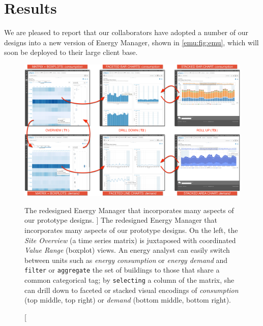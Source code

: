 \section{Results}
\label{emu:results}


We are pleased to report that our collaborators have adopted a number of our designs into a new version of Energy Manager, shown in \autoref{emu:fig:emu}, which will soon be deployed to their large client base.


\begin{figure}
    \centering
	\includegraphics[width=\textwidth]{figures/emu.pdf}
	\caption
	[   
	    The redesigned Energy Manager that incorporates many aspects of our prototype designs.
	]
	{
	    The redesigned Energy Manager that incorporates many aspects of our prototype designs. On the left, the \textsl{Site Overview} (a time series matrix) is juxtaposed with coordinated \textsl{Value Range} (boxplot) views. An energy analyst can easily switch between units such as \textsl{energy consumption} or \textsl{energy demand} and {\tt filter} or {\tt aggregate} the set of buildings to those that share a common categorical tag; by {\tt selecting} a column of the matrix, she can drill down to faceted or stacked visual encodings of \textsl{consumption} (top middle, top right) or \textsl{demand} (bottom middle, bottom right).
	}
	\centering
	\label{emu:fig:emu}
\end{figure} 

